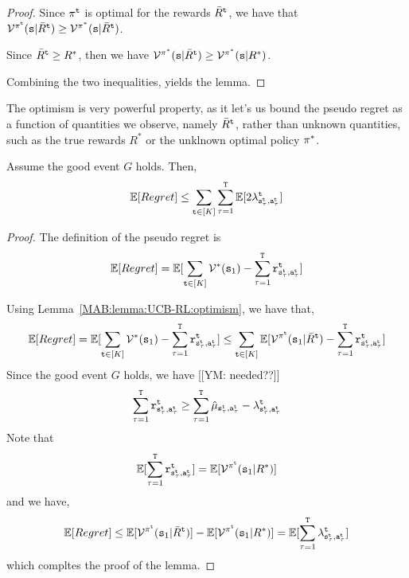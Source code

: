 \begin{proof}
    Since $\pi^{\tt t}$ is optimal for the rewards $\bar{R}^{\tt t}$, we have that $\mathcal{V}^{\pi^{\tt t}}({\tt s} | \bar{R}^{\tt t})\geq \mathcal{V}^{\pi^*}({\tt s} | \bar{R}^{\tt t})$.
    
Since $\bar{R}^{\tt t}\geq R^*$, then we have 
$\mathcal{V}^{\pi^*}({\tt s} | \bar{R}^{\tt t})\geq \mathcal{V}^{\pi^*}({\tt s} | R^*)$.

Combining the two inequalities, yields the lemma.
\end{proof}

The optimism is very powerful property, as it let's us bound the pseudo regret as a function of quantities we observe, namely $\bar{R}^{\tt t}$, rather than unknown quantities, such as the true rewards $R^*$ or the unklnown optimal policy $\pi^*$.

\begin{lemma}
\label{MAB:lemma:UCB-RL:optimism}
Assume the good event $G$ holds. Then,
    \[
    \mathbb{E}[Regret] \leq \sum_{{\tt t}\in [K]} \sum_{\tau=1}^{\tt T}
    \mathbb{E}[2\lambda^{\tt t}_{{\tt s}^{\tt t}_\tau,{\tt a}^{\tt t}_\tau}]
    \]
\end{lemma}

\begin{proof}
    The definition of the pseudo regret is
    \[
    \mathbb{E}[Regret]= \mathbb{E}[\sum_{{\tt t}\in [K]} \mathcal{V}^*({\tt s}_1)-\sum_{\tau=1}^{\tt T} {\tt r}^{\tt t}_{{\tt s}_\tau^{\tt t},{\tt a}_\tau^{\tt t}}]
    \]

Using Lemma~\ref{MAB:lemma:UCB-RL:optimism}, we have that,
    \[
    \mathbb{E}[Regret]= \mathbb{E}[\sum_{{\tt t}\in [K]} \mathcal{V}^*({\tt s}_1)-\sum_{\tau=1}^{\tt T} {\tt r}^{\tt t}_{{\tt s}_\tau^{\tt t},{\tt a}_\tau^{\tt t}}]
    \leq 
    \sum_{{\tt t}\in [K]} 
    \mathbb{E}[\mathcal{V}^{\pi^{\tt t}}({\tt s}_1|\bar{R}^{\tt t})
    -\sum_{\tau=1}^{\tt T} {\tt r}^{\tt t}_{{\tt s}_\tau^{\tt t},{\tt a}_\tau^{\tt t}}]
    \]
Since the good event $G$ holds, we have [[YM: needed??]]
\[
\sum_{\tau=1}^{\tt T} {\tt r}^{\tt t}_{{\tt s}_\tau^{\tt t},{\tt a}_\tau^{\tt t}} \geq \sum_{\tau=1}^{\tt T} 
 \hat{\mu}_{{\tt s}_\tau^{\tt t},{\tt a}_\tau^{\tt t}}-\lambda^{\tt t}_{{\tt s}_\tau^{\tt t},{\tt a}_\tau^{\tt t}}
\]
Note that
\[
\mathbb{E}[\sum_{\tau=1}^{\tt T} {\tt r}^{\tt t}_{{\tt s}_\tau^{\tt t},{\tt a}_\tau^{\tt t}} ] =\mathbb{E}[\mathcal{V}^{\pi^{\tt t}}({\tt s}_1|R^*)]
\]
and we have,
\[
\mathbb{E}[Regret]\leq \mathbb{E}[\mathcal{V}^{\pi^{\tt t}}({\tt s}_1|\bar{R}^{\tt t})] -
\mathbb{E}[\mathcal{V}^{\pi^{\tt t}}({\tt s}_1|R^*)]=
\mathbb{E}[\sum_{\tau=1}^{\tt T} \lambda^{\tt t}_{{\tt s}_\tau^{\tt t},{\tt a}_\tau^{\tt t}} ]
\]
which compltes the proof of the lemma.
\end{proof}


